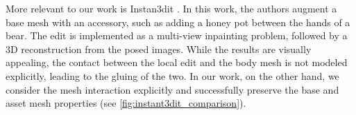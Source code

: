 More relevant to our work is Instan3dit \cite{barda2025instant3dit}. In this work, the authors augment a base mesh with an accessory, such as adding a honey pot between the hands of a bear. The edit is implemented as a multi-view inpainting problem, followed by a 3D reconstruction from the posed images. While the results are visually appealing, the contact between the local edit and the body mesh is not modeled explicitly, leading to the gluing of the two. In our work, on the other hand, we consider the mesh interaction explicitly and successfully preserve the base and asset mesh properties (see \cref{fig:instant3dit_comparison}).




